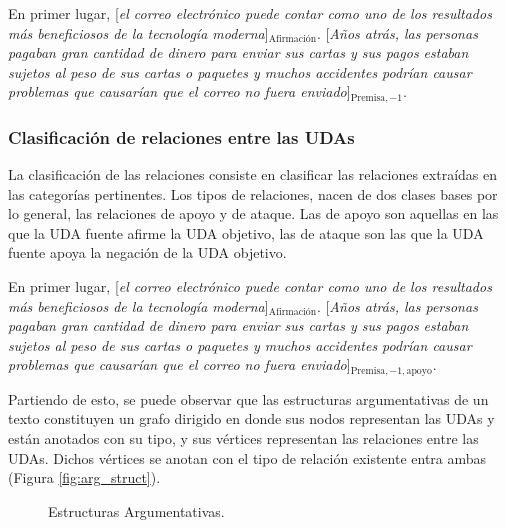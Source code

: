 \begin{adjustwidth}{25pt}{25pt}
    En primer lugar, [\emph{el correo electrónico puede contar como uno de los resultados
    más beneficiosos de la tecnología moderna}]$_{\mathrm{Afirmación}}$. [\emph{Años atrás, las personas pagaban gran cantidad de dinero para 
    enviar sus cartas y sus pagos estaban sujetos al peso de sus cartas o paquetes y muchos accidentes podrían 
    causar problemas que causarían que el correo no fuera enviado}]$_{\mathrm{Premisa, -1}}$.
\end{adjustwidth}

\subsubsection{Clasificación de relaciones entre las UDAs}

La clasificación de las relaciones consiste en clasificar las relaciones extraídas en las categorías pertinentes.
Los tipos de relaciones, nacen de dos clases bases por lo general, las relaciones de apoyo y de ataque.
Las de apoyo son aquellas en las que la UDA fuente afirme la UDA objetivo, las de ataque son 
las que la UDA fuente apoya la negación de la UDA objetivo.

\begin{adjustwidth}{25pt}{25pt}
    En primer lugar, [\emph{el correo electrónico puede contar como uno de los resultados
    más beneficiosos de la tecnología moderna}]$_{\mathrm{Afirmación}}$. [\emph{Años atrás, las personas pagaban gran cantidad de dinero para 
    enviar sus cartas y sus pagos estaban sujetos al peso de sus cartas o paquetes y muchos accidentes podrían 
    causar problemas que causarían que el correo no fuera enviado}]$_{\mathrm{Premisa, -1, apoyo}}$.
\end{adjustwidth}

Partiendo de esto, se puede observar que las estructuras argumentativas de un texto constituyen un grafo dirigido 
en donde sus nodos representan las UDAs y están anotados con su tipo, y sus vértices representan las 
relaciones entre las UDAs. Dichos vértices se anotan con el tipo de relación existente entra ambas 
(Figura \ref{fig:arg_struct}).

\begin{figure}[h!]
	\begin{center}
		\begin{center}
            
        \end{center}
	    \caption{Estructuras Argumentativas.}
	\end{center}
\end{figure}\label{fig:arg_struct}
